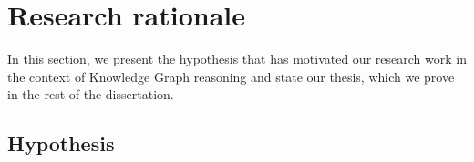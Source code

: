 

\section{Research rationale}\label{sec:intro-rationale}
In this section, we present the hypothesis that has motivated our research work in the context of Knowledge Graph reasoning and state our thesis, which we prove in the rest of the dissertation.

\subsection{Hypothesis}




